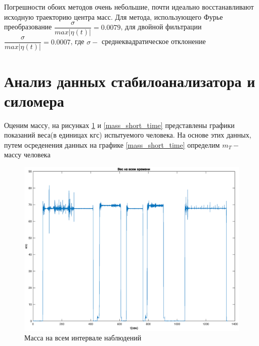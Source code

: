 \documentclass[a4paper,12pt, openany]{book}
\theoremstyle{plain} %
\theoremstyle{definition} %
\theoremstyle{remark} %
\numberwithin{equation}{chapter}
\begin{document}
{Погрешности обоих методов очень небольшие, почти идеально восстанавливают исходную
траекторию центра масс. Для метода, использующего Фурье преобразование
$\dfrac{\sigma}{max|\eta(t)|}=0.0079$, для двойной фильтрации $\dfrac{\sigma}{max|\eta(t)|}=0.0007$, где $\sigma-$ среднеквадратическое отклонение

\section{Анализ данных стабилоанализатора и силомера}
Оценим массу, на рисунках \ref{mass_full_time} и
\ref{mass_short_time} представлены графики показаний веса(в единицах кгс) испытуемого человека.
 На основе этих данных, путем осреденения данных на графике \ref{mass_short_time} определим $m_T -$ массу человека 

\begin{figure}[h!]
    \begin{center}
        \begin{minipage}[h]{0.49\linewidth}
            \includegraphics[width=1\linewidth]{mass_full_time.eps}
            \caption{Масса на всем интервале наблюдений}
            \label{mass_full_time}
        \end{minipage}
        \hfill
        \begin{minipage}[h]{0.49\linewidth}

\end{minipage}
\end{center}
\end{figure}}
\end{document}
